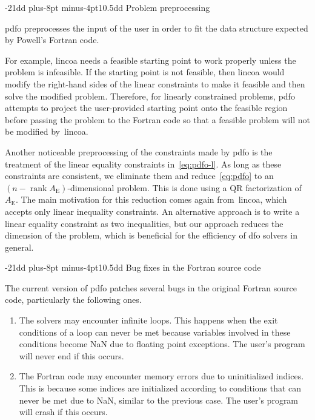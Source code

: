 \documentclass[smallextended]{svjour3}
\makeatletter
\DeclareMathOperator{\rank}{rank}
\newcommand{\aeq}{A_{\scriptscriptstyle\text{E}}}
\def\subsection{\@startsection{subsection}{2}{\z@}%
    {-21dd plus-8pt minus-4pt}{10.5dd}
    {\normalsize\bfseries}}
\makeatother
\begin{document}
\subsection{Problem preprocessing}
\label{subsec:pdfo-preprocessing}

\Gls{pdfo} preprocesses the input of the user in order to fit the data structure expected by Powell's Fortran code.

For example, \gls{lincoa} needs a feasible starting point to work properly unless the problem is infeasible.
If the starting point is not feasible, then \gls{lincoa} would modify the right-hand sides of the linear constraints to make it feasible and then solve the modified problem.
Therefore, for linearly constrained problems, \gls{pdfo} attempts to project the user-provided starting point onto the feasible region before passing the problem to the Fortran code so that a feasible problem will not be modified by~\gls{lincoa}.

Another noticeable preprocessing of the constraints made by \gls{pdfo} is the treatment of the linear equality constraints in~\eqref{eq:pdfo-l}.
As long as these constraints are consistent, we eliminate them and reduce~\eqref{eq:pdfo} to an~$(n - \rank \aeq)$-dimensional problem.
This is done using a QR factorization of~$\aeq$.
The main motivation for this reduction comes again from~\gls{lincoa}, which accepts only linear inequality constraints.
An alternative approach is to write a linear equality constraint as two inequalities, but our approach reduces the dimension of the problem, which is beneficial for the efficiency of \gls{dfo} solvers in general.

\subsection{Bug fixes in the Fortran source code}
\label{subsec:bug-corrections}

The current version of \gls{pdfo} patches several bugs in the original Fortran source code, particularly the following ones.
\begin{enumerate}
    \item The solvers may encounter infinite loops.
        This happens when the exit conditions of a loop can never be met because variables involved in these conditions become NaN due to floating point exceptions.
        The user's program will never end if this occurs.
    \item The Fortran code may encounter memory errors due to uninitialized indices.
        This is because some indices are initialized according to conditions that can never be met due to NaN, similar to the previous case.
        The user's program will crash if this occurs.
\end{enumerate}
\end{document}
